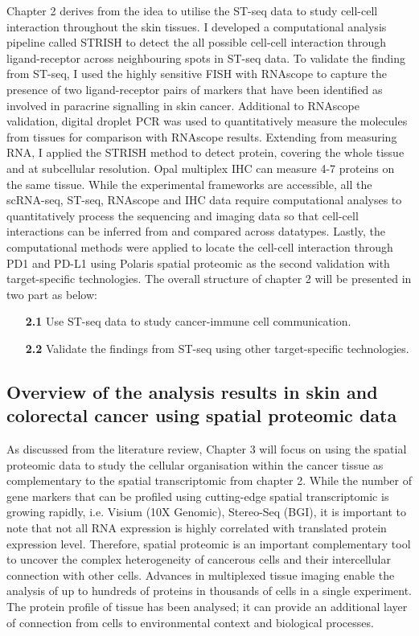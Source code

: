 Chapter 2 derives from the idea to utilise the ST-seq data to study cell-cell interaction throughout the skin tissues. I developed a computational analysis pipeline called STRISH to detect the all possible cell-cell interaction through ligand-receptor across neighbouring spots in ST-seq data. To validate the finding from ST-seq, I used the highly sensitive FISH with RNAscope to capture the presence of two ligand-receptor pairs of markers that have been identified as involved in paracrine signalling in skin cancer. Additional to RNAscope validation, digital droplet PCR was used to quantitatively measure the molecules from tissues for comparison with RNAscope results. Extending from measuring RNA, I applied the STRISH method to detect protein, covering the whole tissue and at subcellular resolution. Opal multiplex IHC can measure 4-7 proteins on the same tissue. While the experimental frameworks are accessible, all the scRNA-seq, ST-seq, RNAscope and IHC data require computational analyses to quantitatively process the sequencing and imaging data so that cell-cell interactions can be inferred from and compared across datatypes. Lastly, the computational methods were applied to locate the cell-cell interaction through PD1 and PD-L1 using Polaris spatial proteomic as the second validation with target-specific technologies. The overall structure of chapter 2 will be presented in two part as below:     
\begin{enumerate}[align=left]
    \item[\textbf{2.1}] Use ST-seq data to study cancer-immune cell communication.
    \item[\textbf{2.2}] Validate the findings from ST-seq using other target-specific technologies.
\end{enumerate}

\subsection{Overview of the analysis results in skin and colorectal cancer using spatial proteomic data}
As discussed from the literature review, Chapter 3 will focus on using the spatial proteomic data to study the cellular organisation within the cancer tissue as complementary to the spatial transcriptomic from chapter 2. While the number of gene markers that can be profiled using cutting-edge spatial transcriptomic is growing rapidly, i.e. Visium (10X Genomic),  Stereo-Seq (BGI), it is important to note that not all RNA expression is highly correlated with translated protein expression level. Therefore, spatial proteomic is an important complementary tool to uncover the complex heterogeneity of cancerous cells and their intercellular connection with other cells. Advances in multiplexed tissue imaging enable the analysis of up to hundreds of proteins in thousands of cells in a single experiment. The protein profile of tissue has been analysed; it can provide an additional layer of connection from cells to environmental context and biological processes.   

